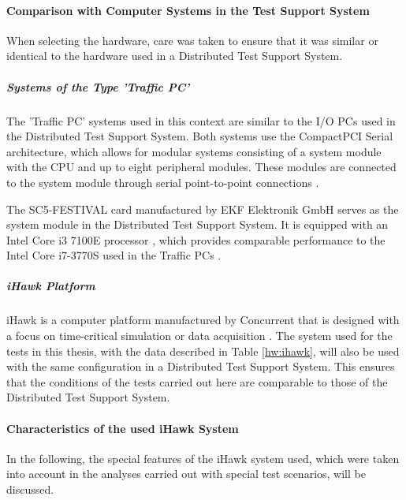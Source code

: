 \paragraph{Comparison with Computer Systems in the Test Support System}
When selecting the hardware, care was taken to ensure that it was similar or identical to the hardware used in a Distributed Test Support System.

\subparagraph{Systems of the Type 'Traffic PC'}
The 'Traffic PC' systems used in this context are similar to the I/O PCs used in the Distributed Test Support System. Both systems use the CompactPCI Serial architecture, which allows for modular systems consisting of a system module with the CPU and up to eight peripheral modules. These modules are connected to the system module through serial point-to-point connections \cite{setup01}.

The SC5-FESTIVAL card manufactured by EKF Elektronik GmbH serves as the system module in the Distributed Test Support System. It is equipped with an Intel Core i3 7100E processor \cite{setup02}, which provides comparable performance to the Intel Core i7-3770S used in the Traffic PCs \cite{setup03}.

\subparagraph{iHawk Platform}
iHawk is a computer platform manufactured by Concurrent that is designed with a focus on time-critical simulation or data acquisition \cite{setup04}. The system used for the tests in this thesis, with the data described in Table \ref{hw:ihawk}, will also be used with the same configuration in a Distributed Test Support System. This ensures that the conditions of the tests carried out here are comparable to those of the Distributed Test Support System.


\paragraph{Characteristics of the used iHawk System} \label{chap:iHawkChar}
In the following, the special features of the iHawk system used, which were taken into account in the analyses carried out with special test scenarios, will be discussed.

